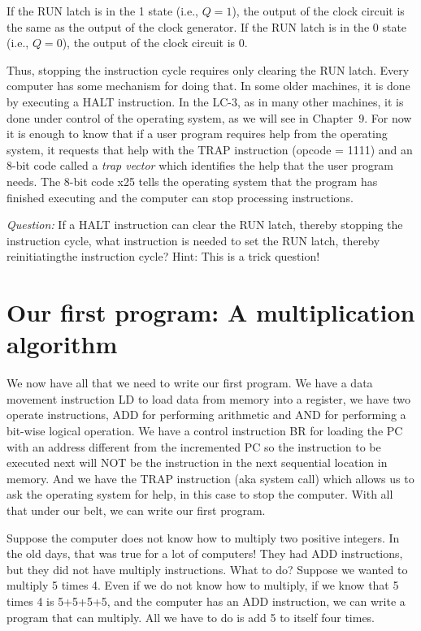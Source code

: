 \documentclass{patt}
\begin{document}
If the RUN latch is in the 1 state (i.e., $Q=1$), the output of the clock
circuit is the same as the output of the clock generator.  If the RUN latch
is in the 0 state (i.e., $Q=0$), the output of the clock circuit is 0.

Thus, stopping the instruction cycle requires only clearing the RUN latch.
Every computer has some mechanism for doing that.
In some older machines, it is done by executing a HALT instruction.
In the LC-3, as in many other machines, it is done under control of the
operating system, as we will see in Chapter~9.  For now it is enough to know
that if a user program requires help from the operating system, it requests that
help with the TRAP instruction (opcode = 1111) and an 8-bit code called
a {\em trap vector} which identifies the help that the user program needs.  
The 8-bit code x25 tells the operating
system that the program has finished executing and the computer can stop
processing instructions.


{\em Question:} If a HALT instruction can clear the RUN latch,
thereby stopping the instruction cycle, what instruction is needed
to set the RUN latch, thereby reinitiating\questionmark[-3.6pc]
the instruction cycle?  Hint: This is a trick question!

\vspace{-30pt}

\section{Our first program: A multiplication algorithm}

We now have all that we need to write our first program.  We have a data
movement instruction LD to load data from memory into a register, we have two
operate instructions, ADD for performing arithmetic and AND for performing 
a bit-wise logical operation.  We have a control instruction BR for loading the
PC with an address different from the incremented PC so the instruction to be
executed next will NOT be the instruction in the next sequential location in 
memory.  And we have the TRAP instruction (aka system call) which allows us 
to ask the operating system for help, in this case to stop the computer.  
With all that under our belt, we can write our first program.

Suppose the computer does not know how to multiply two positive integers.
In the old days, that was true for a lot of computers!  They had ADD 
instructions, but they did not have multiply instructions.  What to do?
Suppose we wanted to multiply 5 times 4.  Even if we do not know how to
multiply, if we know that 5 times 4 is 5+5+5+5, and the computer has an ADD
instruction, we can write a program that can multiply.  All we have to do 
is add 5 to itself four times.  
\end{document}

